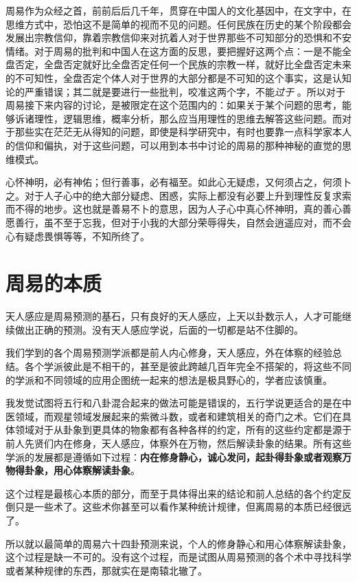 \documentclass[12pt,oneside]{book}
\begin{document}
周易作为众经之首，前前后后几千年，贯穿在中国人的文化基因中，在文字中，在思维方式中，恐怕这不是简单的视而不见的问题。任何民族在历史的某个阶段都会发展出宗教信仰，靠着宗教信仰来对抗着人对于世界那些不可知部分的恐惧和不安情绪。对于周易的批判和中国人在这方面的反思，要把握好这两个点：一是不能全盘否定，全盘否定就好比全盘否定任何一个民族的宗教一样，就好比全盘否定未来的不可知性，全盘否定个体人对于世界的大部分都是不可知的这个事实，这是认知论的严重错误；其二就是要进行一些批判，咬准这两个字，不能\emph{过于} 。所以对于周易接下来内容的讨论，是被限定在这个范围内的：如果关于某个问题的思考，能够诉诸理性，逻辑思维，概率分析，那么应当用理性的思维去解答这些问题。而对于那些实在茫茫无从得知的问题，即使是科学研究中，有时也要靠一点科学家本人的信仰和偏执，对于这些问题，可以用到本书中讨论的周易的那种神秘的直觉的思维模式。

心怀神明，必有神佑；但行善事，必有福至。如此心无疑虑，又何须占之，何须卜之。对于人子心中的绝大部分疑虑、困惑，实际上都没有必要上升到理性反复求索而不得的地步。这也就是善易不卜的意思，因为人子心中真心怀神明，真的善心善愿善行，虽不至于忘我，但对于小我的大部分荣辱得失，自然会逍遥应对，而不会心有疑虑畏惧等等，不知所终了。




\section{周易的本质}
天人感应是周易预测的基石，只有良好的天人感应，上天以卦数示人，人才可能继续做出正确的预测。没有天人感应学说，后面的一切都是站不住脚的。

我们学到的各个周易预测学派都是前人内心修身，天人感应，外在体察的经验总结。各个学派彼此是不相干的，甚至是彼此跨越几百年完全不搭架的，将这些不同的学派和不同领域的应用企图统一起来的想法是极具野心的，学者应该慎重。

我发觉试图将五行和八卦混合起来的做法可能是错误的，五行学说更适合的是在中医领域，而观星领域发展起来的紫微斗数，或者和建筑相关的奇门之术。它们在具体领域对于从卦象到更具体的物象都有各种各样的约定，所有的这些约定都是源于前人先贤们内在修身，天人感应，体察外在万物，然后解读卦象的结果。所有这些学派的发展都是遵循如下过程：\textbf{内在修身静心，诚心发问，起卦得卦象或者观察万物得卦象，用心体察解读卦象}。

这个过程是最核心本质的部分，而至于具体得出来的结论和前人总结的各个约定反倒只是一些术了。这些术你甚至可以看作某种统计规律，但离周易的本质已经很远了。

所以就以最简单的周易六十四卦预测来说，个人的修身静心和用心体察解读卦象，这个过程是缺一不可的。没有这个过程，而是试图从周易预测的各个术中寻找科学或者某种规律的东西，那就实在是南辕北辙了。
\end{document}
